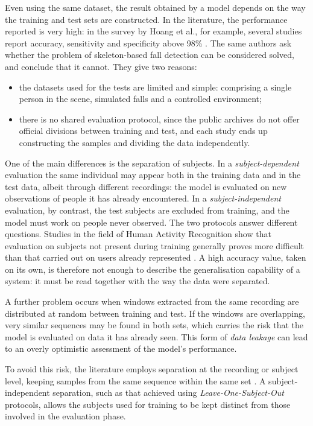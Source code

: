 Even using the same dataset, the result obtained by a model depends on the way the training and test sets are constructed. In the literature, the performance reported is very high: in the survey by Hoang et al., for example, several studies report accuracy, sensitivity and specificity above 98\% \cite{HO}. The same authors ask whether the problem of skeleton-based fall detection can be considered solved, and conclude that it cannot. They give two reasons:
\begin{itemize}
    \item the datasets used for the tests are limited and simple: comprising a single person in the scene, simulated falls and a controlled environment;
    \item there is no shared evaluation protocol, since the public archives do not offer official divisions between training and test, and each study ends up constructing the samples and dividing the data independently.
\end{itemize}

One of the main differences is the separation of subjects. In a \emph{subject-dependent} evaluation the same individual may appear both in the training data and in the test data, albeit through different recordings: the model is evaluated on new observations of people it has already encountered. In a \emph{subject-independent} evaluation, by contrast, the test subjects are excluded from training, and the model must work on people never observed.
The two protocols answer different questions. Studies in the field of Human Activity Recognition show that evaluation on subjects not present during training generally proves more difficult than that carried out on users already represented \cite{SC}. A high accuracy value, taken on its own, is therefore not enough to describe the generalisation capability of a system: it must be read together with the way the data were separated.

A further problem occurs when windows extracted from the same recording are distributed at random between training and test. If the windows are overlapping, very similar sequences may be found in both sets, which carries the risk that the model is evaluated on data it has already seen. This form of \emph{data leakage} can lead to an overly optimistic assessment of the model's performance.

To avoid this risk, the literature employs separation at the recording or subject level, keeping samples from the same sequence within the same set \cite{SC}. A subject-independent separation, such as that achieved using \emph{Leave-One-Subject-Out} protocols, allows the subjects used for training to be kept distinct from those involved in the evaluation phase.

